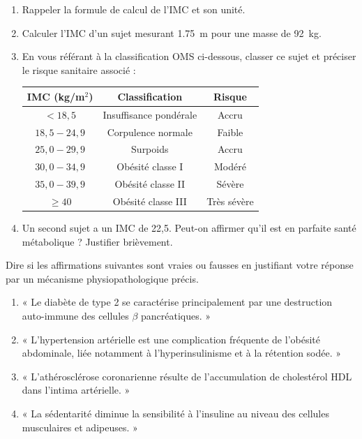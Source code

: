 \documentclass[11pt]{article}
\begin{document}
\begin{exercice}
\begin{enumerate}
    \item Rappeler la formule de calcul de l'IMC et son unité.
    \item Calculer l'IMC d'un sujet mesurant \SI{1,75}{\meter} pour une masse de \SI{92}{\kilogram}.
    \item En vous référant à la classification OMS ci-dessous, classer ce sujet et préciser le risque sanitaire associé :
    \begin{center}
    \begin{tabular}{|c|c|c|}
    \hline
    \textbf{IMC (kg/m$^2$)} & \textbf{Classification} & \textbf{Risque} \\
    \hline
    $< 18,5$ & Insuffisance pondérale & Accru \\
    \hline
    $18,5 - 24,9$ & Corpulence normale & Faible \\
    \hline
    $25,0 - 29,9$ & Surpoids & Accru \\
    \hline
    $30,0 - 34,9$ & Obésité classe I & Modéré \\
    \hline
    $35,0 - 39,9$ & Obésité classe II & Sévère \\
    \hline
    $\ge 40$ & Obésité classe III & Très sévère \\
    \hline
    \end{tabular}
    \end{center}
    \item Un second sujet a un IMC de 22,5. Peut-on affirmer qu'il est en parfaite santé métabolique ? Justifier brièvement.
\end{enumerate}
\end{exercice}

\begin{exercice}
Dire si les affirmations suivantes sont vraies ou fausses en justifiant votre réponse par un mécanisme physiopathologique précis.
\begin{enumerate}
    \item « Le diabète de type 2 se caractérise principalement par une destruction auto-immune des cellules $\beta$ pancréatiques. »
    \item « L'hypertension artérielle est une complication fréquente de l'obésité abdominale, liée notamment à l'hyperinsulinisme et à la rétention sodée. »
    \item « L'athérosclérose coronarienne résulte de l'accumulation de cholestérol HDL dans l'intima artérielle. »
    \item « La sédentarité diminue la sensibilité à l'insuline au niveau des cellules musculaires et adipeuses. »
\end{enumerate}
\end{exercice}
\end{document}
